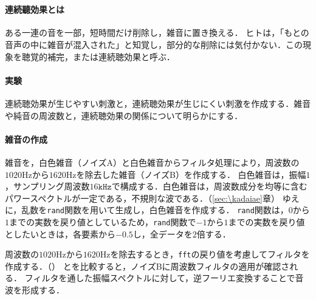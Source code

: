 \section{\kadaidb}\label{sec:\kadaidb}
\purpose
\paragraph{連続聽効果とは}
ある一連の音を一部，短時間だけ削除し，雑音に置き換える．
ヒトは，「もとの音声の中に雑音が混入された」と知覚し，部分的な削除には気付かない．この現象を聴覚的補完，または連続聴効果と呼ぶ．\cite[p.182\ -\ p.183]{感覚知覚心理学}
\paragraph{実験}
連続聴効果が生じやすい刺激と，連続聴効果が生じにくい刺激を作成する．雑音や純音の周波数と，連続聴効果の関係について明らかにする．
\method
\paragraph{雑音の作成}
雑音を，白色雑音（ノイズA）と白色雑音からフィルタ処理により，周波数の\(1020\textrm{Hz}\)から\(1620\textrm{Hz}\)を除去した雑音（ノイズB）を作成する．
白色雑音は，振幅\(1\)，サンプリング周波数\(16\texttt{kHz}\)で構成する．白色雑音は，周波数成分を均等に含むパワースペクトルが一定である，不規則な波である．（\ref{sec:\kadaiae}章）
ゆえに，乱数を\texttt{rand}関数を用いて生成し，白色雑音を作成する．
\texttt{rand}関数は，\(0\)から\(1\)までの実数を戻り値としているため，\texttt{rand}関数で\(-1\)から\(1\)までの実数を戻り値としたいときは，各要素から\(-0.5\)し，全データを\(2\)倍する．\par
周波数の\(1020\textrm{Hz}\)から\(1620\textrm{Hz}\)を除去するとき，\texttt{fft}の戻り値を考慮してフィルタを作成する．（）
とを比較すると，ノイズBに周波数フィルタの適用が確認される．
フィルタを通した振幅スペクトルに対して，逆フーリエ変換することで音波を形成する．\par
